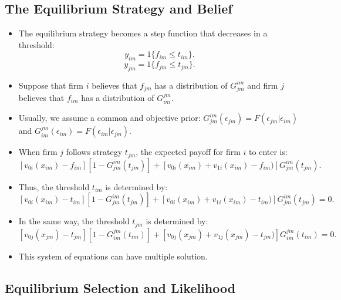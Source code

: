 \documentclass[
]{book}
\providecommand{\tightlist}{%
  \setlength{\itemsep}{0pt}\setlength{\parskip}{0pt}}
\begin{document}
\hypertarget{the-equilibrium-strategy-and-belief}{%
\subsection{The Equilibrium Strategy and Belief}\label{the-equilibrium-strategy-and-belief}}

\begin{itemize}
\tightlist
\item
  The equilibrium strategy becomes a step function that decreases in a threshold:
  \[
  y_{im} = 1\{f_{im} \le t_{im}\}.
  \]
  \[
  y_{jm} = 1\{f_{jm} \le t_{jm}\}.
  \]
\item
  Suppose that firm \(i\) believes that \(f_{jm}\) has a distribution of \(G_{jm}^{im}\) and firm \(j\) believes that \(f_{im}\) has a distribution of \(G_{im}^{jm}\).
\item
  Usually, we assume a common and objective prior: \(G_{jm}^{im}(\epsilon_{jm}) = F(\epsilon_{jm}|\epsilon_{im})\) and \(G_{im}^{jm}(\epsilon_{im}) = F(\epsilon_{im}|\epsilon_{jm})\).
\item
  When firm \(j\) follows strategy \(t_{jm}\), the expected payoff for firm \(i\) to enter is:
  \[
  [v_{0i}(x_{im}) - f_{im}][1 - G_{jm}^{im}(t_{jm})] + [v_{0i}(x_{im}) + v_{1i}(x_{im}) - f_{im})] G_{jm}^{im}(t_{jm}).
  \]
\item
  Thus, the threshold \(t_{im}\) is determined by:
  \[
  [v_{0i}(x_{im}) - t_{im}][1 - G_{jm}^{im}(t_{jm})] + [v_{0i}(x_{im}) + v_{1i}(x_{im}) - t_{im})] G_{jm}^{im}(t_{jm}) = 0.
  \]
\item
  In the same way, the threshold \(t_{jm}\) is determined by:
  \[
  [v_{0j}(x_{jm}) - t_{jm}][1 - G_{im}^{jm}(t_{im})] + [v_{0j}(x_{jm}) + v_{1j}(x_{jm}) - t_{jm})] G_{im}^{jm}(t_{im}) = 0.
  \]
\item
  This system of equations can have multiple solution.
\end{itemize}

\hypertarget{equilibrium-selection-and-likelihood}{%
\subsection{Equilibrium Selection and Likelihood}\label{equilibrium-selection-and-likelihood}}
\end{document}
